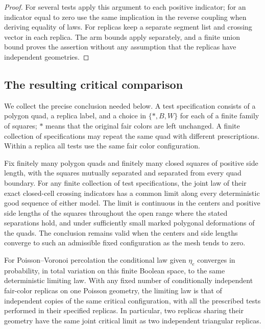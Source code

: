 \begin{proof}
For several tests apply this argument to each positive indicator; for an
indicator equal to zero use the same implication in the reverse coupling
when deriving equality of laws. For replicas keep a separate segment list
and crossing vector in each replica. The arm bounds apply separately, and
a finite union bound proves the assertion without any assumption that
the replicas have independent geometries.
\end{proof}

\subsection{The resulting critical comparison}
\label{subsec:critical-comparison}

We collect the precise conclusion needed below. A test specification consists
of a polygon quad, a replica label, and a choice in $\{*,B,W\}$ for each of a
finite family of squares; $*$ means that the original fair colors are left
unchanged. A finite collection of specifications may repeat the same quad
with different prescriptions. Within a replica all tests use the same fair
color configuration.

\begin{proposition}
\label{prop:critical-tests}
Fix finitely many polygon quads and finitely many closed squares of positive
side length, with the squares mutually separated and separated from every
quad boundary. For any finite collection of test specifications, the joint
law of their exact closed-cell crossing indicators has a common limit along
every deterministic good sequence of either model. The limit is continuous
in the centers and positive side lengths of the squares throughout the open
range where the stated separations hold, and under sufficiently small marked
polygonal deformations of the quads. The conclusion remains valid when the
centers and side lengths converge to such an admissible fixed configuration
as the mesh tends to zero.

For Poisson--Voronoi percolation the conditional law given $\eta_e$ converges
in probability, in total variation on this finite Boolean space, to the
same deterministic limiting law. With any fixed number of conditionally
independent fair-color replicas on one Poisson geometry, the limiting law
is that of independent copies of the same critical configuration, with all
the prescribed tests performed in their specified replicas. In particular,
two replicas sharing their geometry have the same joint critical limit as
two independent triangular replicas.
\end{proposition}

